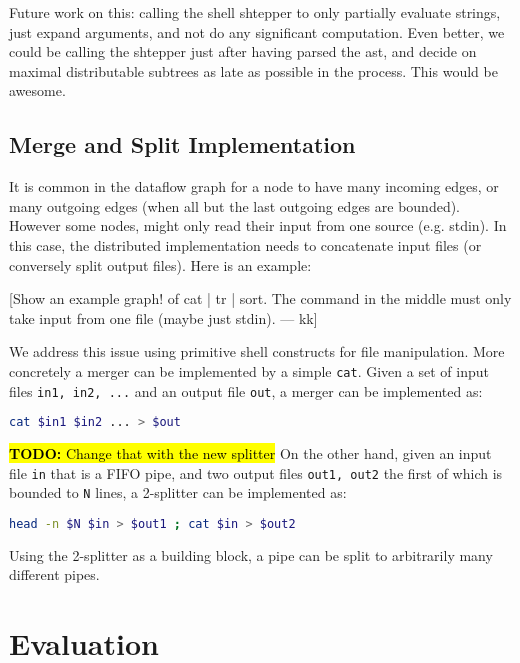 \documentclass[sigplan,10pt,review,anonymous]{acmart}
\newcommand{\TODO}[1]{\hl{\textbf{TODO:} #1}\xspace}
\newcommand{\kk}[1]{[{\color{magenta}#1 --- kk}]}
\begin{document}
Future work on this: calling the shell shtepper to only partially
evaluate strings, just expand arguments, and not do any significant
computation. Even better, we could be calling the shtepper just after
having parsed the ast, and decide on maximal distributable subtrees as
late as possible in the process. This would be awesome.

\subsection{Merge and Split Implementation}

It is common in the dataflow graph for a node to have many incoming
edges, or many outgoing edges (when all but the last outgoing edges
are bounded). However some nodes, might only read their input from one
source (e.g. stdin). In this case, the distributed implementation
needs to concatenate input files (or conversely split output
files). Here is an example:

\kk{Show an example graph! of cat | tr | sort. The command in the
  middle must only take input from one file (maybe just stdin).}

We address this issue using primitive shell constructs for file
manipulation. More concretely a merger can be implemented by a simple
\verb|cat|. Given a set of input files \verb|in1, in2, ...| and an
output file \verb|out|, a merger can be implemented as:

\begin{lstlisting}[language=sh, float=h, numbers=none]
 cat $in1 $in2 ... > $out
\end{lstlisting}

\noindent
\TODO{Change that with the new splitter}
On the other hand, given an input file \verb|in| that is a FIFO pipe,
and two output files \verb|out1, out2| the first of which is bounded
to \verb|N| lines, a 2-splitter can be implemented as:

\begin{lstlisting}[language=sh, float=h, numbers=none]
 head -n $N $in > $out1 ; cat $in > $out2
\end{lstlisting}

\noindent
Using the 2-splitter as a building block, a pipe can be split to
arbitrarily many different pipes.


\section{Evaluation}
\label{eval}
\end{document}
